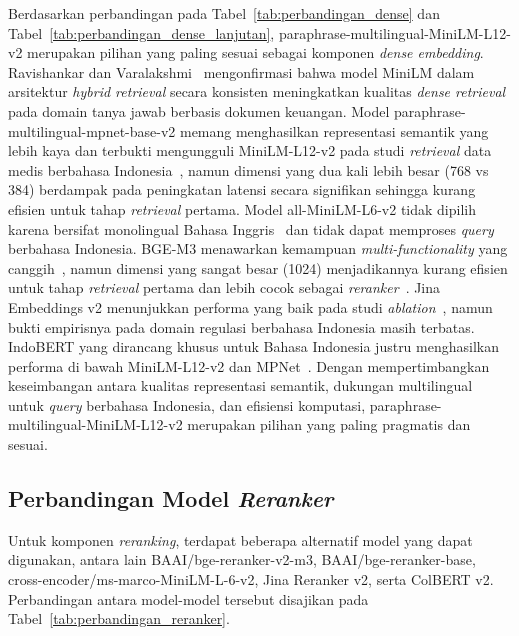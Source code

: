 Berdasarkan perbandingan pada Tabel~\ref{tab:perbandingan_dense} dan Tabel~\ref{tab:perbandingan_dense_lanjutan}, paraphrase-multilingual-MiniLM-L12-v2 merupakan pilihan yang paling sesuai sebagai komponen \textit{dense embedding}. Ravishankar dan Varalakshmi~\cite{ravishankar2025hybrid} mengonfirmasi bahwa model MiniLM dalam arsitektur \textit{hybrid retrieval} secara konsisten meningkatkan kualitas \textit{dense retrieval} pada domain tanya jawab berbasis dokumen keuangan. Model paraphrase-multilingual-mpnet-base-v2 memang menghasilkan representasi semantik yang lebih kaya dan terbukti mengungguli MiniLM-L12-v2 pada studi \textit{retrieval} data medis berbahasa Indonesia~\cite{maryamah2024mpnet}, namun dimensi yang dua kali lebih besar (768 vs 384) berdampak pada peningkatan latensi secara signifikan sehingga kurang efisien untuk tahap \textit{retrieval} pertama. Model all-MiniLM-L6-v2 tidak dipilih karena bersifat monolingual Bahasa Inggris~\cite{reimers2019sbert} dan tidak dapat memproses \textit{query} berbahasa Indonesia. BGE-M3 menawarkan kemampuan \textit{multi-functionality} yang canggih~\cite{chen2024bge}, namun dimensi yang sangat besar (1024) menjadikannya kurang efisien untuk tahap \textit{retrieval} pertama dan lebih cocok sebagai \textit{reranker}~\cite{elkiran2026empirical}. Jina Embeddings v2 menunjukkan performa yang baik pada studi \textit{ablation}~\cite{ravishankar2025hybrid}, namun bukti empirisnya pada domain regulasi berbahasa Indonesia masih terbatas. IndoBERT yang dirancang khusus untuk Bahasa Indonesia justru menghasilkan performa di bawah MiniLM-L12-v2 dan MPNet~\cite{maryamah2024mpnet}. Dengan mempertimbangkan keseimbangan antara kualitas representasi semantik, dukungan multilingual untuk \textit{query} berbahasa Indonesia, dan efisiensi komputasi, paraphrase-multilingual-MiniLM-L12-v2 merupakan pilihan yang paling pragmatis dan sesuai.

\subsection{Perbandingan Model \textit{Reranker}}

Untuk komponen \textit{reranking}, terdapat beberapa alternatif model yang dapat digunakan, antara lain BAAI/bge-reranker-v2-m3, BAAI/bge-reranker-base, cross-encoder/ms-marco-MiniLM-L-6-v2, Jina Reranker v2, serta ColBERT v2. Perbandingan antara model-model tersebut disajikan pada Tabel~\ref{tab:perbandingan_reranker}.

